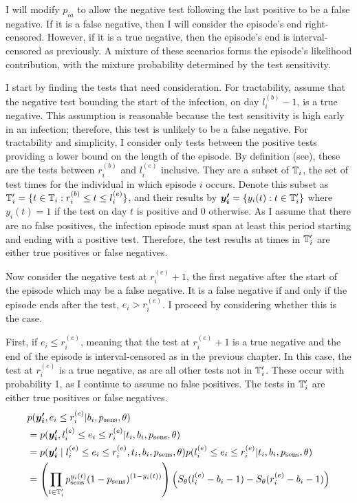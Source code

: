 \documentclass[thesis.tex]{subfiles}
\begin{document}

I will modify $p_{ia}$ to allow the negative test following the last positive to be a false negative.
If it is a false negative, then I will consider the episode's end right-censored.
However, if it is a true negative, then the episode's end is interval-censored as previously.
A mixture of these scenarios forms the episode's likelihood contribution, with the mixture probability determined by the test sensitivity.

I start by finding the tests that need consideration.
For tractability, assume that the negative test bounding the start of the infection, on day $l_i^{(b)}-1$, is a true negative.
This assumption is reasonable because the test sensitivity is high early in an infection; therefore, this test is unlikely to be a false negative.
For tractability and simplicity, I consider only tests between the positive tests providing a lower bound on the length of the episode.
By definition (see), these are the tests between $r_i^{(b)}$ and $l_i^{(e)}$ inclusive.
They are a subset of $\mathbb{T}_i$, the set of test times for the individual in which episode $i$ occurs.
Denote this subset as $\mathbb{T}'_i = \{ t \in \mathbb{T}_i : r_i^{(b)} \leq t \leq l_i^{(e)} \}$, and their results by $\bm{y_i'} = \{ y_i(t) : t \in \mathbb{T}'_i \}$ where $y_i(t) = 1$ if the test on day $t$ is positive and 0 otherwise.
As I assume that there are no false positives, the infection episode must span at least this period starting and ending with a positive test.
Therefore, the test results at times in $\mathbb{T}_i'$ are either true positives or false negatives.

Now consider the negative test at $r_i^{(e)}+1$, the first negative after the start of the episode which may be a false negative.
It is a false negative if and only if the episode ends after the test, \ie $e_i > r_i^{(e)}$.
I proceed by considering whether this is the case.

First, if $e_i \leq r_i^{(e)}$, meaning that the test at $r_i^{(e)}+1$ is a true negative and the end of the episode is interval-censored as in the previous chapter.
In this case, the test at $r_i^{(e)}$ is a true negative, as are all other tests not in $\mathbb{T}'_i$.
These occur with probability 1, as I continue to assume no false positives.
The tests in $\mathbb{T}_i'$ are either true positives or false negatives.
\begin{align}
&p(\vec{y_i'}, e_i \leq r_i^{(e)} | b_i, p_\text{sens}, \theta) \\
&= p(\vec{y_i'}, l_i^{(e)} \leq e_i \leq r_i^{(e)} | t_i, b_i, p_\text{sens}, \theta) \\ %
&= p(\vec{y_i'} \mid l_i^{(e)} \leq e_i \leq r_i^{(e)}, t_i, b_i, p_\text{sens}, \theta) p(l_i^{(e)} \leq e_i \leq r_i^{(e)} | t_i, b_i, p_\text{sens}, \theta) \\
&= \left( \prod_{t \in \sched'_i} p_\text{sens}^{y_i(t)} (1 - p_\text{sens})^{(1 - y_i(t))} \right) \left( S_\theta(l_i^{(e)} - b_i - 1) - S_\theta(r_i^{(e)} - b_i - 1) \right)
\end{align}
\end{document}
